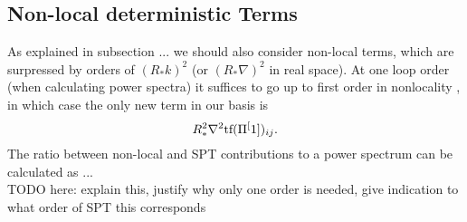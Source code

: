 \documentclass[11pt]{article}
\DeclareRobustCommand{\tf}{\ifmmode\text{tf}\else d\fi}
\begin{document}
\subsection{Non-local deterministic Terms}
As explained in subsection ... %
we should also consider non-local terms, which are surpressed by orders of $(R_*k)^2$ (or $(R_*\nabla)^2$ in real space). At one loop order (when calculating power spectra) it suffices to go up to first order in nonlocality \cite{Mirbabayi_2015}, in which case the only new term in our basis is
$$
R^2_*\nabla^2\tf(\Pi^[1])_{ij}.
$$
The ratio between non-local and SPT contributions to a power spectrum can be calculated as ... \\
TODO here: explain this, justify why only one order is needed, give indication to what order of SPT this corresponds
\end{document}
